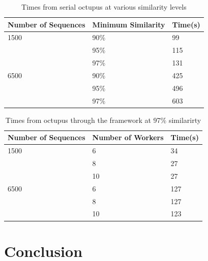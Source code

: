 \documentclass[12pt]{article}
\begin{document}
\begin{table}
    \begin{center}
    \begin{tabular}{|l|l|l|}
    \hline
        Number of Sequences & Minimum Similarity & Time(s) \\ \hline
        1500                & 90\%               & 99      \\
        ~                   & 95\%               & 115     \\
        ~                   & 97\%               & 131     \\ \hline
        6500                & 90\%               & 425     \\
        ~                   & 95\%               & 496     \\
        ~                   & 97\%               & 603     \\ \hline
    \end{tabular}
    \caption{Times from serial octupus at various similarity levels}
    \end{center}
    \label{tab:octu1}
\end{table}

\begin{table}
    \begin{center}
    \begin{tabular}{|l|l|l|}
        \hline
        Number of Sequences & Number of Workers & Time(s) \\ \hline
        1500                & 6                 & 34      \\
        ~                   & 8                 & 27      \\
        ~                   & 10                & 27      \\ \hline
        6500                & 6                 & 127     \\
        ~                   & 8                 & 127     \\
        ~                   & 10                & 123     \\ \hline
    \end{tabular}
    \caption{Times from octupus through the framework at 97\% similarirty}
    \end{center}
    \label{tab:octu2}
\end{table}

\section{Conclusion}
\end{document}
